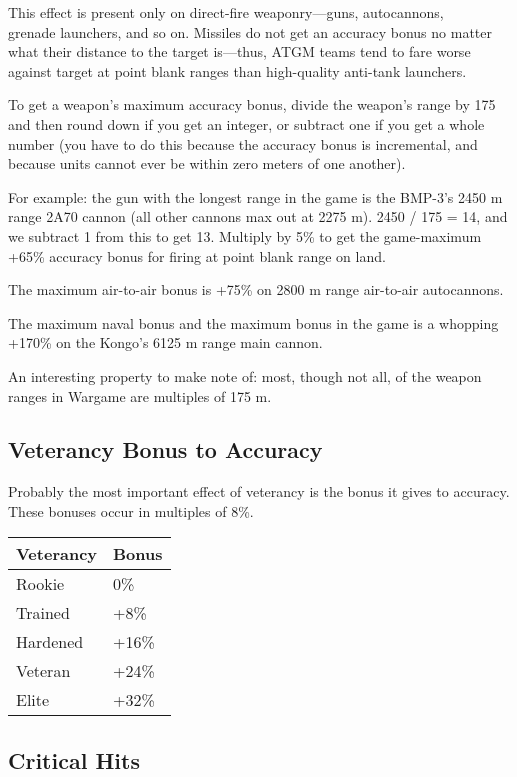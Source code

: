 \documentclass{article}
\begin{document}
This effect is present only on direct-fire weaponry---guns, autocannons,\\
grenade launchers, and so on. Missiles do not get an accuracy bonus no matter
what their distance to the target is---thus, ATGM teams tend to fare worse
against target at point blank ranges than high-quality anti-tank launchers.

To get a weapon's maximum accuracy bonus, divide the weapon's range by 175 and
then round down if you get an integer, or subtract one if you get a whole number
(you have to do this because the accuracy bonus is incremental, and because
units cannot ever be within zero meters of one another).

For example: the gun with the longest range in the game is the BMP-3's 2450 m
range 2A70 cannon (all other cannons max out at 2275 m). 2450 / 175 = 14, and we
subtract 1 from this to get 13. Multiply by 5\% to get the game-maximum +65\%
accuracy bonus for firing at point blank range on land.

The maximum air-to-air bonus is +75\% on 2800 m range air-to-air autocannons.

The maximum naval bonus and the maximum bonus in the game is a whopping +170\%
on the Kongo's 6125 m range main cannon.

An interesting property to make note of: most, though not all, of the weapon
ranges in Wargame are multiples of 175 m.

\subsection{Veterancy Bonus to Accuracy}

Probably the most important effect of veterancy is the bonus it gives to
accuracy. These bonuses occur in multiples of 8\%.

\begin{center}
    \begin{tabular}{ | l | l | }
    \hline
    Veterancy & Bonus \\ \hline
    Rookie & 0\% \\
    Trained & +8\% \\ 
    Hardened & +16\% \\ 
    Veteran & +24\% \\ 
    Elite & +32\% \\
    \hline
    \end{tabular}
\end{center}

\subsection{Critical Hits}
\end{document}
